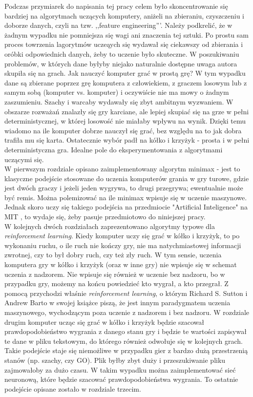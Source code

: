 \documentclass[licencjacka]{pracamgr}
\begin{document}
Podczas przymiarek do napisania tej pracy celem było skoncentrowanie się bardziej na algorytmach uczących komputery, aniżeli na zbieraniu, czyszczeniu i doborze danych, czyli na tzw. ,,feature engineering'''. Należy podkrelić,  że w żadnym wypadku nie pomniejsza się wagi ani znaczenia tej sztuki. Po prostu sam proces towrzenia lagorytmów uczeąych się wydawał się ciekawszy od zbierania i oróbki odpowiednich danych, żeby to uczenie było skuteczne. W poszukiwaniu problemów, w których dane byłyby niejako naturalnie dostępne uwaga autora skupiła się na grach. Jak nauczyć komputer grać w prostą grę?  W tym wypadku dane są zbierane poprzez grę komputera z człowiekiem, z graczem losowym lub z samym sobą (komputer vs. komputer) i oczywiście nie ma mowy o żadnym zaszumieniu. Szachy i warcaby wydawały się zbyt ambitnym wyzwaniem. W obszarze rozważań znalazły się gry karciane, ale lepiej skupiać się na grze w pełni deterministycznej, w której losowość nie miałaby wpływu na wynik. Dzięki temu wiadomo na ile komputer dobrze nauczył się grać, bez względu na to jak dobra trafiła mu się karta. Ostatecznie wybór padł na kółko i krzyżyk - prosta i w pełni deterministyczna gra. Idealne pole do eksperymentowania z algorytmami uczącymi się. \\

W pierwszym rozdziale opisano zaimplementowany algorytm minimax - jest to klasyczne podejście stosowane do uczenia komputerów grania w gry turowe, gdzie jest dwóch graczy i jeżeli jeden wygrywa, to drugi przegrywa; ewentualnie może być remis.  Można polemizować na ile minimax wpisuje się w uczenie maszynowe. Jednak skoro uczy się takiego podejścia na przedmiocie "Artificial Inteligence"  na MIT \cite{MIT_AI},  to wydaje się, żeby pasuje przedmiotowo do niniejszej pracy.\\

W kolejnych dwóch rozdziałach zaprezentowano algorytmy typowe dla \textit{reinforcement learning}. Kiedy komputer uczy się grać w kółko i krzyżyk, to po wykonaniu ruchu, o ile ruch nie kończy gry,  nie ma natychmiastowej informacji zwrotnej, czy to był dobry ruch, czy też zły ruch. W tym sensie, uczenia komputera gry w kółko i krzyżyk (oraz w inne gry) nie wpisuje się w schemat uczenia z nadzorem. Nie wpisuje się również w uczenie bez nadzoru, bo w przypadku gry, możemy na końcu powiedzieć kto wygrał, a kto przegrał. Z pomocą przychodzi właśnie \textit{reinforcement learning}, o którym Richard S. Sutton i Andrew Barto w swojej książce \cite{RL} piszą, że jest innym paradygmatem uczenia maszynowego, wychodzącym poza uczenie z nadzorem i bez nadzoru.  W rozdziale drugim komputer ucząc się grać w kółko i krzyżyk będzie szacował prawdopodobieństwo wygrania z danego stanu gry i będzie te wartości zapisywał te dane w pliku tekstowym, do którego również odwołuje się w kolejnych grach. Takie podejście staje się niemożliwe w przypadku gier z bardzo dużą przestrzenią stanów (np. szachy, czy GO). Plik byłby zbyt duży i przeszukiwanie pliku zajmowałoby za dużo czasu. W takim wypadku można zaimplementować sieć neuronową, które będzie szacować prawdopodobieństwa wygrania. To ostatnie podejście opisane zostało w rozdziale trzecim. \\
\end{document}
